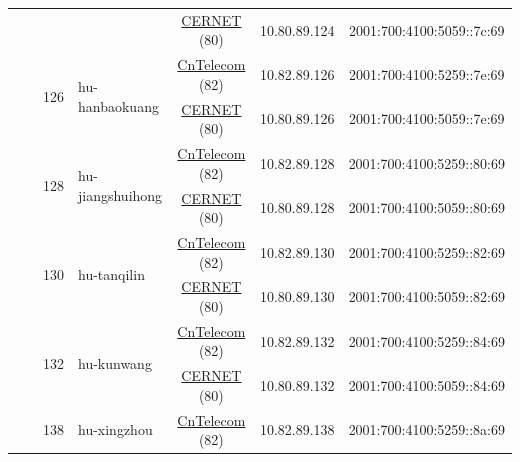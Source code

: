 \begin{small}
\begin{center}
\begin{longtable}{|c|c|c|c|c|c|c|c|}
  &  &  &  & \multicolumn{2}{|c|}{\tiny{\href{http://www.cernet.edu.cn}{CERNET} (80)}} & \tiny{10.80.89.124} & \tiny{2001:700:4100:5059::7c:69} \\* \cline{3-3}\cline{4-4}\cline{5-5}\cline{6-6}\cline{7-7}\cline{8-8}
  &  & \multirow{2}{*}{\tiny{126}} & \multicolumn{1}{|l|}{\multirow{2}{*}{\tiny{hu-hanbaokuang}}} & \multicolumn{2}{|c|}{\tiny{\href{http://www.chinatelecom.com.cn}{CnTelecom} (82)}} & \tiny{10.82.89.126} & \tiny{2001:700:4100:5259::7e:69} \\* \cline{5-5}\cline{6-6}\cline{7-7}\cline{8-8}
  &  &  &  & \multicolumn{2}{|c|}{\tiny{\href{http://www.cernet.edu.cn}{CERNET} (80)}} & \tiny{10.80.89.126} & \tiny{2001:700:4100:5059::7e:69} \\* \cline{3-3}\cline{4-4}\cline{5-5}\cline{6-6}\cline{7-7}\cline{8-8}
  &  & \multirow{2}{*}{\tiny{128}} & \multicolumn{1}{|l|}{\multirow{2}{*}{\tiny{hu-jiangshuihong}}} & \multicolumn{2}{|c|}{\tiny{\href{http://www.chinatelecom.com.cn}{CnTelecom} (82)}} & \tiny{10.82.89.128} & \tiny{2001:700:4100:5259::80:69} \\* \cline{5-5}\cline{6-6}\cline{7-7}\cline{8-8}
  &  &  &  & \multicolumn{2}{|c|}{\tiny{\href{http://www.cernet.edu.cn}{CERNET} (80)}} & \tiny{10.80.89.128} & \tiny{2001:700:4100:5059::80:69} \\* \cline{3-3}\cline{4-4}\cline{5-5}\cline{6-6}\cline{7-7}\cline{8-8}
  &  & \multirow{2}{*}{\tiny{130}} & \multicolumn{1}{|l|}{\multirow{2}{*}{\tiny{hu-tanqilin}}} & \multicolumn{2}{|c|}{\tiny{\href{http://www.chinatelecom.com.cn}{CnTelecom} (82)}} & \tiny{10.82.89.130} & \tiny{2001:700:4100:5259::82:69} \\* \cline{5-5}\cline{6-6}\cline{7-7}\cline{8-8}
  &  &  &  & \multicolumn{2}{|c|}{\tiny{\href{http://www.cernet.edu.cn}{CERNET} (80)}} & \tiny{10.80.89.130} & \tiny{2001:700:4100:5059::82:69} \\* \cline{3-3}\cline{4-4}\cline{5-5}\cline{6-6}\cline{7-7}\cline{8-8}
  &  & \multirow{2}{*}{\tiny{132}} & \multicolumn{1}{|l|}{\multirow{2}{*}{\tiny{hu-kunwang}}} & \multicolumn{2}{|c|}{\tiny{\href{http://www.chinatelecom.com.cn}{CnTelecom} (82)}} & \tiny{10.82.89.132} & \tiny{2001:700:4100:5259::84:69} \\* \cline{5-5}\cline{6-6}\cline{7-7}\cline{8-8}
  &  &  &  & \multicolumn{2}{|c|}{\tiny{\href{http://www.cernet.edu.cn}{CERNET} (80)}} & \tiny{10.80.89.132} & \tiny{2001:700:4100:5059::84:69} \\* \cline{3-3}\cline{4-4}\cline{5-5}\cline{6-6}\cline{7-7}\cline{8-8}
  &  & \multirow{2}{*}{\tiny{138}} & \multicolumn{1}{|l|}{\multirow{2}{*}{\tiny{hu-xingzhou}}} & \multicolumn{2}{|c|}{\tiny{\href{http://www.chinatelecom.com.cn}{CnTelecom} (82)}} & \tiny{10.82.89.138} & \tiny{2001:700:4100:5259::8a:69} \\* \cline{5-5}\cline{6-6}\cline{7-7}\cline{8-8}

\end{longtable}
\end{center}
\end{small}
